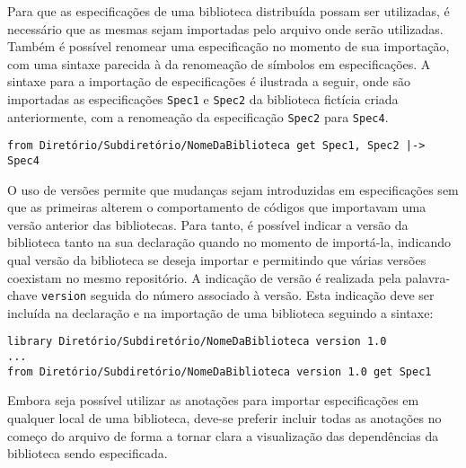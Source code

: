 Para que as especificações de uma biblioteca distribuída possam ser utilizadas, é necessário que as mesmas sejam importadas pelo arquivo onde serão utilizadas.
Também é possível renomear uma especificação no momento de sua importação, com uma sintaxe parecida à da renomeação de símbolos em especificações.
A sintaxe para a importação de especificações é ilustrada a seguir, onde são importadas as especificações \Verb.Spec1. e \Verb.Spec2. da biblioteca fictícia criada anteriormente, com a renomeação da especificação \Verb.Spec2. para \Verb.Spec4..
\begin{Verbatim}
from Diretório/Subdiretório/NomeDaBiblioteca get Spec1, Spec2 |-> Spec4
\end{Verbatim}

O uso de versões permite que mudanças sejam introduzidas em especificações sem que as primeiras alterem o comportamento de códigos que importavam uma versão anterior das bibliotecas.
Para tanto, é possível indicar a versão da biblioteca tanto na sua declaração quando no momento de importá-la, indicando qual versão da biblioteca se deseja importar e permitindo que várias versões coexistam no mesmo repositório.
A indicação de versão é realizada pela palavra-chave \Verb.version. seguida do número associado à versão.
Esta indicação deve ser incluída na declaração e na importação de uma biblioteca seguindo a sintaxe:
\begin{Verbatim}
library Diretório/Subdiretório/NomeDaBiblioteca version 1.0
...
from Diretório/Subdiretório/NomeDaBiblioteca version 1.0 get Spec1
\end{Verbatim}

Embora seja possível utilizar as anotações para importar especificações em qualquer local de uma biblioteca, deve-se preferir incluir todas as anotações no começo do arquivo de forma a tornar clara a visualização das dependências da biblioteca sendo especificada.